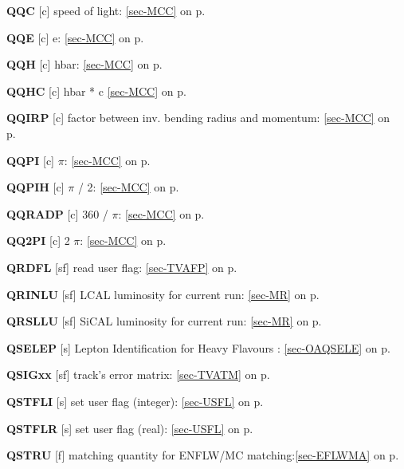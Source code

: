  \item{\bf QQC     }[c] speed of light: \ref{sec-MCC} on p.~\pageref{sec-MCC}\\
 \item{\bf QQE     }[c] e: \ref{sec-MCC} on p.~\pageref{sec-MCC}\\
 \item{\bf QQH     }[c] hbar: \ref{sec-MCC} on p.~\pageref{sec-MCC}\\
 \item{\bf QQHC    }[c] hbar * c \ref{sec-MCC} on p.~\pageref{sec-MCC}\\
 \item{\bf QQIRP   }[c] factor between inv. bending radius and momentum:
 \ref{sec-MCC} on p.~\pageref{sec-MCC}\\
 \item{\bf QQPI    }[c] $\pi$: \ref{sec-MCC} on p.~\pageref{sec-MCC}\\
 \item{\bf QQPIH   }[c] $\pi$ / 2: \ref{sec-MCC} on p.~\pageref{sec-MCC}\\
 \item{\bf QQRADP  }[c] 360 / $\pi$: \ref{sec-MCC} on p.~\pageref{sec-MCC}\\
 \item{\bf QQ2PI   }[c] 2 $\pi$: \ref{sec-MCC} on p.~\pageref{sec-MCC}
 
 \item{\bf QRDFL   }[sf] read user flag: \ref{sec-TVAFP} on p.~\pageref{sec-TVAFP}\\
 \item{\bf QRINLU  }[sf] LCAL  luminosity for current run: \ref{sec-MR} on p.~\pageref{sec-MR}\\
 \item{\bf QRSLLU  }[sf] SiCAL luminosity for current run: \ref{sec-MR} on p.~\pageref{sec-MR}\\
 \item{\bf QSELEP  }[s] Lepton Identification for Heavy Flavours : \ref{sec-OAQSELE} on p.~\pageref{sec-OAQSELE}\\
 \item{\bf QSIGxx  }[sf] track's error matrix: \ref{sec-TVATM} on p.~\pageref{sec-TVATM}\\
 \item{\bf QSTFLI  }[s] set user flag (integer): \ref{sec-USFL} on p.~\pageref{sec-USFL}\\
 \item{\bf QSTFLR  }[s] set user flag (real): \ref{sec-USFL} on p.~\pageref{sec-USFL}\\
 \item{\bf QSTRU   }[f] matching quantity for ENFLW/MC matching:\ref{sec-EFLWMA} on p.~\pageref{sec-EFLWMA}
 
